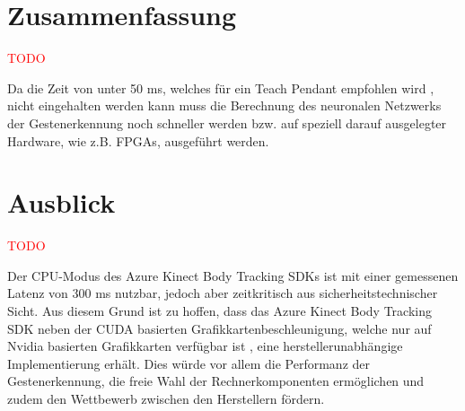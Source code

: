 \section{Zusammenfassung}

\textcolor{red}{TODO}


Da die Zeit von unter 50 ms, welches für ein Teach Pendant empfohlen wird \cite[55]{prassler_advances_2004}, nicht eingehalten werden kann  muss die Berechnung des neuronalen Netzwerks der Gestenerkennung noch schneller werden bzw. auf speziell darauf ausgelegter Hardware, wie z.B. FPGAs, ausgeführt werden.

\section{Ausblick}
\textcolor{red}{TODO}







Der CPU-Modus des Azure Kinect Body Tracking SDKs ist mit einer gemessenen Latenz von 300 ms nutzbar, jedoch aber zeitkritisch aus sicherheitstechnischer Sicht. Aus diesem Grund ist zu hoffen, dass das Azure Kinect Body Tracking SDK neben der CUDA basierten Grafikkartenbeschleunigung, welche nur auf Nvidia basierten Grafikkarten verfügbar ist \cite{encausse_body_nodate}, eine herstellerunabhängige Implementierung erhält. Dies würde vor allem die Performanz der Gestenerkennung, die freie Wahl der Rechnerkomponenten ermöglichen und zudem den Wettbewerb zwischen den Herstellern fördern.\\

